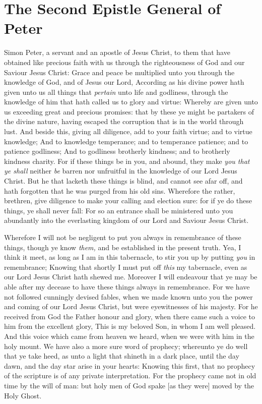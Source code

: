 \documentclass[11pt,letterpaper,oneside]{memoir}
\begin{document}
\chapter[2 Peter]{ The Second Epistle General of Peter}
Simon Peter, a servant and an apostle of Jesus Christ, to them that have
obtained like precious faith with us through the righteousness of God
and our Saviour Jesus Christ: Grace and peace be multiplied unto you
through the knowledge of God, and of Jesus our Lord, According as his
divine power hath given unto us all things that \emph{pertain} unto life
and godliness, through the knowledge of him that hath called us to glory
and virtue: Whereby are given unto us exceeding great and precious
promises: that by these ye might be partakers of the divine nature,
having escaped the corruption that is in the world through lust. And
beside this, giving all diligence, add to your faith virtue; and to
virtue knowledge; And to knowledge temperance; and to temperance
patience; and to patience godliness; And to godliness brotherly
kindness; and to brotherly kindness charity. For if these things be in
you, and abound, they make \emph{you that ye shall} neither \emph{be}
barren nor unfruitful in the knowledge of our Lord Jesus Christ. But he
that lacketh these things is blind, and cannot see afar off, and hath
forgotten that he was purged from his old sins. Wherefore the rather,
brethren, give diligence to make your calling and election sure: for if
ye do these things, ye shall never fall: For so an entrance shall be
ministered unto you abundantly into the everlasting kingdom of our Lord
and Saviour Jesus Christ.

Wherefore I will not be negligent to put you always in remembrance of
these things, though ye know \emph{them,} and be established in the
present truth. Yea, I think it meet, as long as I am in this tabernacle,
to stir you up by putting \emph{you} in remembrance; Knowing that
shortly I must put off \emph{this} my tabernacle, even as our Lord Jesus
Christ hath shewed me. Moreover I will endeavour that ye may be able
after my decease to have these things always in remembrance. For we have
not followed cunningly devised fables, when we made known unto you the
power and coming of our Lord Jesus Christ, but were eyewitnesses of his
majesty. For he received from God the Father honour and glory, when
there came such a voice to him from the excellent glory, This is my
beloved Son, in whom I am well pleased. And this voice which came from
heaven we heard, when we were with him in the holy mount. We have also a
more sure word of prophecy; whereunto ye do well that ye take heed, as
unto a light that shineth in a dark place, until the day dawn, and the
day star arise in your hearts: Knowing this first, that no prophecy of
the scripture is of any private interpretation. For the prophecy came
not in old time by the will of man: but holy men of God spake [as they
were] moved by the Holy Ghost.
\end{document}
